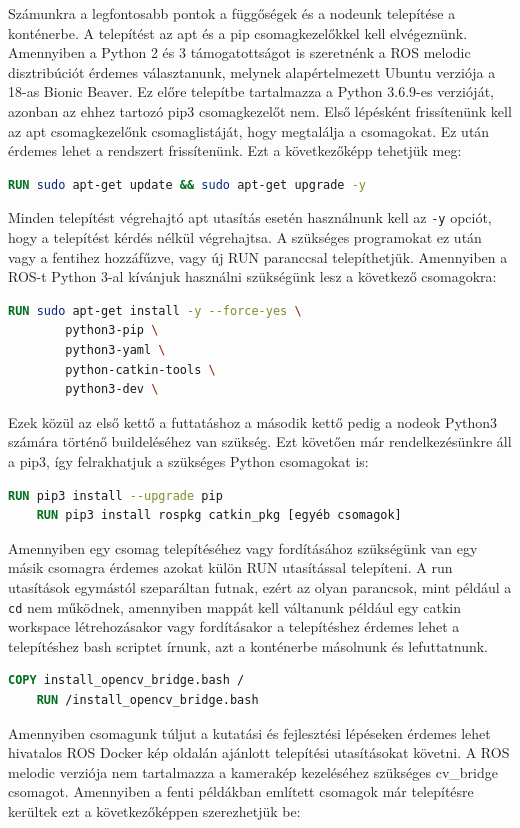 Számunkra a legfontosabb pontok a függőségek és a nodeunk telepítése a konténerbe. A telepítést az apt és a pip csomagkezelőkkel kell elvégeznünk. Amennyiben a Python 2 és 3 támogatottságot is szeretnénk a ROS melodic disztribúciót érdemes választanunk, melynek alapértelmezett Ubuntu verziója a 18-as Bionic Beaver. Ez előre telepítbe tartalmazza a Python 3.6.9-es verzióját, azonban az ehhez tartozó pip3 csomagkezelőt nem. Első lépésként frissítenünk kell az apt csomagkezelőnk csomaglistáját, hogy megtalálja a csomagokat. Ez után érdemes lehet a rendszert frissítenünk. Ezt a következőképp tehetjük meg:
\begin{lstlisting}[language=Dockerfile]
    RUN sudo apt-get update && sudo apt-get upgrade -y
\end{lstlisting}
Minden telepítést végrehajtó apt utasítás esetén használnunk kell az \lstinline{-y} opciót, hogy a telepítést kérdés nélkül végrehajtsa. A szükséges programokat ez után vagy a fentihez hozzáfűzve, vagy új RUN paranccsal telepíthetjük. Amennyiben a ROS-t Python 3-al kívánjuk használni szükségünk lesz a következő csomagokra:
\begin{lstlisting}[language=Dockerfile]
    RUN sudo apt-get install -y --force-yes \
        python3-pip \
        python3-yaml \
        python-catkin-tools \
        python3-dev \
\end{lstlisting}
Ezek közül az első kettő a futtatáshoz a második kettő pedig a nodeok Python3 számára történő buildeléséhez van szükség. Ezt követően már rendelkezésünkre áll a pip3, így felrakhatjuk a szükséges Python csomagokat is:
\begin{lstlisting}[language=Dockerfile]
    RUN pip3 install --upgrade pip
    RUN pip3 install rospkg catkin_pkg [egyéb csomagok]
\end{lstlisting}
Amennyiben egy csomag telepítéséhez vagy fordításához szükségünk van egy másik csomagra érdemes azokat külön RUN utasítással telepíteni. A run utasítások egymástól szeparáltan futnak, ezért az olyan parancsok, mint például a \lstinline{cd} nem működnek, amennyiben mappát kell váltanunk például egy catkin workspace létrehozásakor vagy fordításakor a telepítéshez érdemes lehet a telepítéshez bash scriptet írnunk, azt a konténerbe másolnunk és lefuttatnunk.
\begin{lstlisting}[language=Dockerfile]
    COPY install_opencv_bridge.bash /
    RUN /install_opencv_bridge.bash
\end{lstlisting}
Amennyiben csomagunk túljut a kutatási és fejlesztési lépéseken érdemes lehet hivatalos ROS Docker kép oldalán ajánlott telepítési utasításokat \cite{noauthor_ros-official-image_nodate} követni. A ROS melodic verziója nem tartalmazza a kamerakép kezeléséhez szükséges cv\_bridge csomagot. Amennyiben a fenti példákban említett csomagok már telepítésre kerültek ezt a következőképpen szerezhetjük be:
